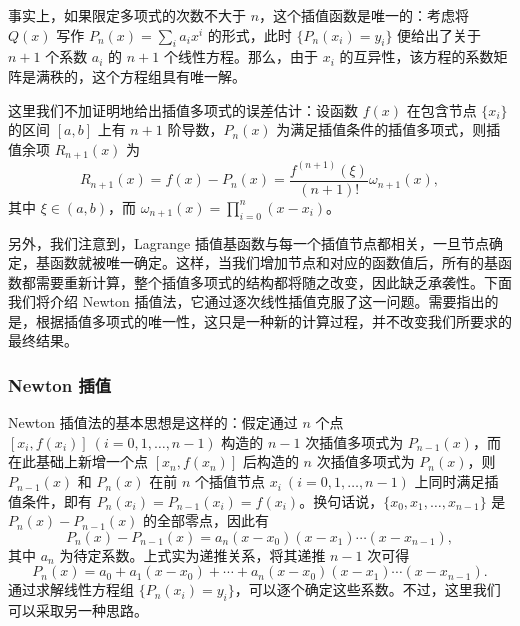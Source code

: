 事实上，如果限定多项式的次数不大于 $n$，这个插值函数是唯一的：考虑将 $Q(x)$ 写作 $P_n(x)=\sum_i a_i x^i$ 的形式，此时 $\{P_n(x_i)=y_i\}$ 便给出了关于 $n+1$ 个系数 $a_i$ 的 $n+1$ 个线性方程。那么，由于 $x_i$ 的互异性，该方程的系数矩阵是满秩的，这个方程组具有唯一解。

这里我们不加证明地给出插值多项式的误差估计：设函数 $f(x)$ 在包含节点 $\{x_i\}$ 的区间 $[a,b]$ 上有 $n+1$ 阶导数，$P_n(x)$ 为满足插值条件的插值多项式，则插值余项 $R_{n+1}(x)$ 为
\begin{equation}
 R_{n+1}(x)=f(x)-P_n(x)=\frac{f^{(n+1)}(\xi)}{(n+1)!}\omega_{n+1}(x),
\tag{2.1.3}
\end{equation}
其中 $\xi\in(a,b)$，而 $\omega_{n+1}(x)=\prod_{i=0}^{n}(x-x_i)$。

另外，我们注意到，Lagrange 插值基函数与每一个插值节点都相关，一旦节点确定，基函数就被唯一确定。这样，当我们增加节点和对应的函数值后，所有的基函数都需要重新计算，整个插值多项式的结构都将随之改变，因此缺乏承袭性。下面我们将介绍 Newton 插值法，它通过逐次线性插值克服了这一问题。需要指出的是，根据插值多项式的唯一性，这只是一种新的计算过程，并不改变我们所要求的最终结果。

\subsubsection{Newton 插值}

Newton 插值法的基本思想是这样的：假定通过 $n$ 个点 $[x_i,f(x_i)]\ (i=0,1,\ldots,n-1)$ 构造的 $n-1$ 次插值多项式为 $P_{n-1}(x)$，而在此基础上新增一个点 $[x_n,f(x_n)]$ 后构造的 $n$ 次插值多项式为 $P_n(x)$，则 $P_{n-1}(x)$ 和 $P_n(x)$ 在前 $n$ 个插值节点 $x_i\ (i=0,1,\ldots,n-1)$ 上同时满足插值条件，即有 $P_n(x_i)=P_{n-1}(x_i)=f(x_i)$。换句话说，$\{x_0,x_1,\ldots,x_{n-1}\}$ 是 $P_n(x)-P_{n-1}(x)$ 的全部零点，因此有
\begin{equation}
 P_n(x)-P_{n-1}(x)=a_n(x-x_0)(x-x_1)\cdots(x-x_{n-1}),
\tag{2.1.4}
\end{equation}
其中 $a_n$ 为待定系数。上式实为递推关系，将其递推 $n-1$ 次可得
\begin{equation}
 P_n(x)=a_0+a_1(x-x_0)+\cdots+a_n(x-x_0)(x-x_1)\cdots(x-x_{n-1}).
\tag{2.1.5}
\end{equation}
通过求解线性方程组 $\{P_n(x_i)=y_i\}$，可以逐个确定这些系数。不过，这里我们可以采取另一种思路。

